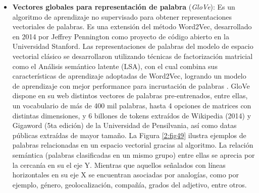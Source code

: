 \begin{itemize}
\begin{itemize}
		\item \textbf{Vectores globales para representación de palabra} (\textit{GloVe}): Es un algoritmo de aprendizaje no supervisado para obtener representaciones vectoriales de palabras. Es una extensión del método Word2Vec, desarrollado en 2014 por Jeffrey Pennington como proyecto de código abierto en la Universidad Stanford. Las representaciones de palabras del modelo de espacio vectorial clásico se desarrollaron utilizando técnicas de factorización matricial como el Análisis semántico latente (LSA), con el cual combina sus características de aprendizaje adoptadas de Word2Vec, logrando un modelo de aprendizaje con mejor performance para incrustación de palabras \parencite{gl_pennington2014glove}. GloVe dispone en su web distintos vectores de palabras pre-entrenados, entre ellas, un vocabulario de más de 400 mil palabras, hasta 4 opciones de matrices con distintas dimensiones, y 6 billones de tokens extraídos de Wikipedia (2014) y Gigaword (5ta edición) de la Universidad de Pensilvania, así como datas públicas extraídas de mayor tamaño. La Figura \ref{2:fig49} ilustra ejemplos de palabras  relacionadas en un espacio vectorial gracias al algoritmo. La relación semántica (palabras clasificadas en un mismo grupo) entre ellas se aprecia por la cercanía en su el eje Y. Mientras que aquellos señalados con líneas horizontales en su eje X se encuentran asociadas por analogías, como por ejemplo, género, geolocalización, compañía, grados del adjetivo, entre otros.
		

\end{itemize}
\end{itemize}
